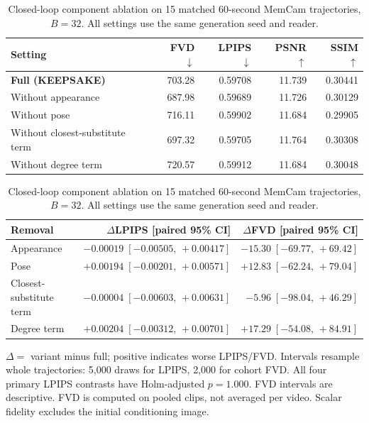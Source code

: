 \begin{table}[!ht]
\centering\small
\caption{Closed-loop component ablation on 15 matched 60-second MemCam
trajectories, $B=32$. All settings use the same generation seed and reader.}
\label{tab:components-generation-preview}
\setlength{\tabcolsep}{4pt}
\begin{tabular*}{\linewidth}{@{\extracolsep{\fill}}lrrrr@{}}
\toprule
Setting & FVD $\downarrow$ & LPIPS $\downarrow$ & PSNR $\uparrow$ & SSIM $\uparrow$ \\
\midrule
\textbf{Full (KEEPSAKE)} & 703.28 & 0.59708 & 11.739 & 0.30441 \\
Without appearance & 687.98 & 0.59689 & 11.726 & 0.30129 \\
Without pose & 716.11 & 0.59902 & 11.684 & 0.29905 \\
Without closest-substitute term & 697.32 & 0.59705 & 11.764 & 0.30308 \\
Without degree term & 720.57 & 0.59912 & 11.684 & 0.30048 \\
\bottomrule
\end{tabular*}
\par\medskip
\begin{tabular*}{\linewidth}{@{\extracolsep{\fill}}lrr@{}}
\toprule
Removal & $\Delta$LPIPS [paired 95\% CI] & $\Delta$FVD [paired 95\% CI] \\
\midrule
Appearance & $-0.00019\;[-0.00505,\,+0.00417]$ & $-15.30\;[-69.77,\,+69.42]$ \\
Pose & $+0.00194\;[-0.00201,\,+0.00571]$ & $+12.83\;[-62.24,\,+79.04]$ \\
Closest-substitute term & $-0.00004\;[-0.00603,\,+0.00631]$ & $-5.96\;[-98.04,\,+46.29]$ \\
Degree term & $+0.00204\;[-0.00312,\,+0.00701]$ & $+17.29\;[-54.08,\,+84.91]$ \\
\bottomrule
\end{tabular*}
\par\smallskip
\begin{minipage}{\linewidth}\footnotesize
$\Delta=$ variant minus full; positive indicates worse LPIPS/FVD.
Intervals resample whole trajectories: 5,000 draws for LPIPS, 2,000 for cohort
FVD. All four primary LPIPS contrasts have Holm-adjusted $p=1.000$.
FVD intervals are descriptive. FVD is computed on pooled clips, not averaged
per video. Scalar fidelity excludes the initial conditioning image.
\end{minipage}
\end{table}
